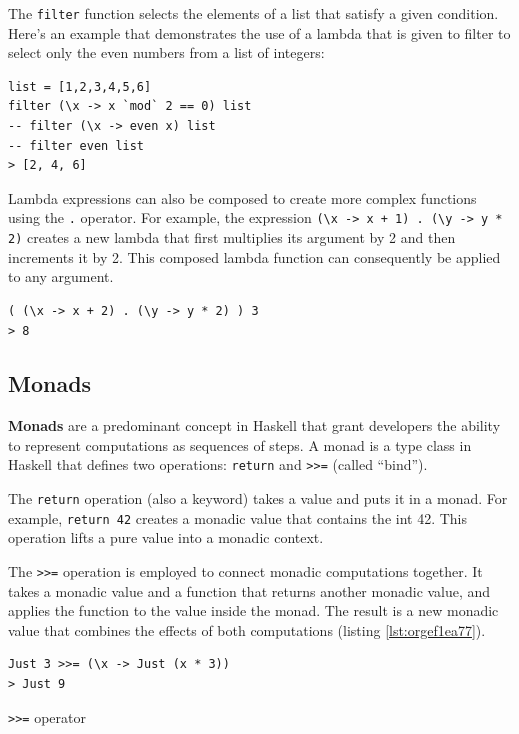\documentclass[a4paper, titlepage, twoside]{article}
\begin{document}
The \texttt{filter} function selects the elements of a list that satisfy a given condition. Here's an example that demonstrates the use of a lambda that is given to filter to select only the even numbers from a list of integers:

\begin{verbatim}
list = [1,2,3,4,5,6]
filter (\x -> x `mod` 2 == 0) list
-- filter (\x -> even x) list
-- filter even list
> [2, 4, 6]
\end{verbatim}

Lambda expressions can also be composed to create more complex functions using the \texttt{.} operator. For example, the expression \texttt{(\textbackslash{}x -> x + 1) .  (\textbackslash{}y -> y * 2)} creates a new lambda that first multiplies its argument by 2 and then increments it by 2. This composed lambda function can consequently be applied to any argument.

\begin{verbatim}
( (\x -> x + 2) . (\y -> y * 2) ) 3
> 8
\end{verbatim}

\subsection{Monads}
\label{sec:org23d850f}

\textbf{Monads} are a predominant concept in Haskell that grant developers the ability to represent computations as sequences of steps. A monad is a type class in Haskell that defines two operations: \texttt{return} and \texttt{>{}>{}=} (called ``bind'').

The \texttt{return} operation (also a keyword) takes a value and puts it in a monad. For example, \texttt{return 42} creates a monadic value that contains the int 42. This operation lifts a pure value into a monadic context.

The \texttt{>{}>{}=} operation is employed to connect monadic computations together. It takes a monadic value and a function that returns another monadic value, and applies the function to the value inside the monad. The result is a new monadic value that combines the effects of both computations (listing \ref{lst:orgef1ea77}).

\begin{listing}[htbp]
\begin{verbatim}
Just 3 >>= (\x -> Just (x * 3)) 
> Just 9
\end{verbatim}
\caption{\label{lst:orgef1ea77}\texttt{>{}>{}=} operator}
\end{listing}
\end{document}
